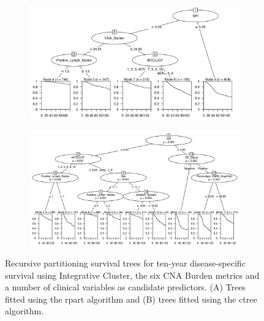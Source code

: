 \begin{figure}[!h]
\centering

\vspace{1cm}

\begin{subfigure}{\textwidth}
\subcaption{}
\includegraphics[width=1\textwidth]{../figures/Chapter_3/Clin_PartyKit_Survival_Burden_TenYearDSS_INTCLUST.png}
\end{subfigure}

\vspace{3cm}

\begin{subfigure}{\textwidth}
\subcaption{}
\includegraphics[width=1\textwidth]{../figures/Chapter_3/Clin_Ctree_Survival_Burden_TenYearDSS_INTCLUST.png}
\end{subfigure}

\vspace{1cm}

\caption[Recursive partitioning survival trees for ten-year disease-specific survival using Integrative Cluster, the six CNA Burden metrics and a number of clinical variables as candidate predictors.]{Recursive partitioning survival trees for ten-year disease-specific survival using Integrative Cluster, the six CNA Burden metrics and a number of clinical variables as candidate predictors. (A) Trees fitted using the rpart algorithm and (B) trees fitted using the ctree algorithm.}
\label{fig:INTCLUST_CNA_Burden_TenYearDSS_Clin}
\end{figure}

